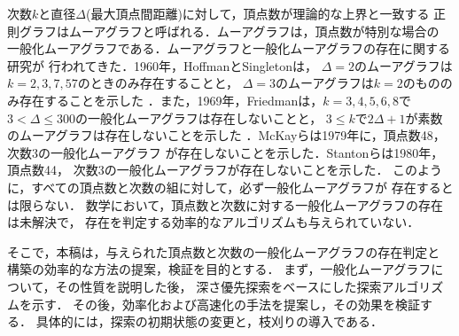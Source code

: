 次数$k$と直径$\Delta$(最大頂点間距離)に対して，頂点数が理論的な上界と一致する
正則グラフはムーアグラフと呼ばれる．ムーアグラフは，頂点数が特別な場合の
一般化ムーアグラフである．ムーアグラフと一般化ムーアグラフの存在に関する研究が
行われてきた\cite{Miller2005}．1960年，HoffmanとSingletonは，
$\Delta=2$のムーアグラフは$k=2,3,7,57$のときのみ存在することと，
$\Delta=3$のムーアグラフは$k=2$のもののみ存在することを示した
\cite{Hoffman1960}．また，1969年，Friedmanは，$k=3,4,5,6,8$で
$3<\Delta\leq300$の一般化ムーアグラフは存在しないことと，
$3\leq k$で$2\Delta+1$が素数のムーアグラフは存在しないことを示した
\cite{Friedman1971}．McKayらは1979年に，頂点数48，次数3の一般化ムーアグラフ
が存在しないことを\cite{McKay1979}示した．Stantonらは1980年，頂点数44，
次数3の一般化ムーアグラフが存在しないことを示した\cite{Stanton1980}．
このように，すべての頂点数と次数の組に対して，必ず一般化ムーアグラフが
存在するとは限らない．
数学において，頂点数と次数に対する一般化ムーアグラフの存在は未解決で，
存在を判定する効率的なアルゴリズムも与えられていない．

そこで，本稿は，与えられた頂点数と次数の一般化ムーアグラフの存在判定と
構築の効率的な方法の提案，検証を目的とする．
まず，一般化ムーアグラフについて，その性質を説明した後，
深さ優先探索をベースにした探索アルゴリズムを示す．
その後，効率化および高速化の手法を提案し，その効果を検証する．
具体的には，探索の初期状態の変更と，枝刈りの導入である．

